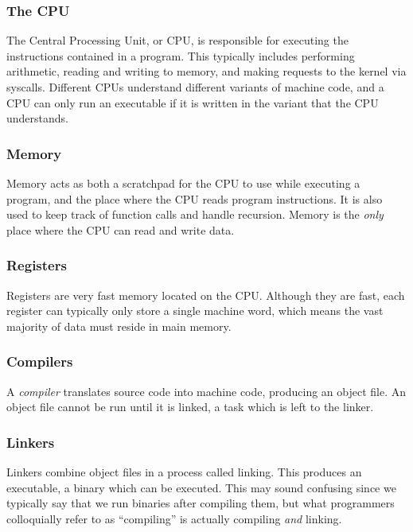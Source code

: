 \subsubsection{The CPU}
The Central Processing Unit, or CPU, is responsible for executing the
instructions contained in a program. This typically includes performing
arithmetic, reading and writing to memory, and making requests to the kernel via
syscalls. Different CPUs understand different variants of machine code, and a
CPU can only run an executable if it is written in the variant that the CPU
understands.

\subsubsection{Memory}
Memory acts as both a scratchpad for the CPU to use while executing a program,
and the place where the CPU reads program instructions. It is also used to keep
track of function calls and handle recursion. Memory is the \emph{only} place
where the CPU can read and write data.

\subsubsection{Registers}
Registers are very fast memory located on the CPU. Although they are fast, each
register can typically only store a single machine word, which means the vast
majority of data must reside in main memory. 

\subsubsection{Compilers}
A \emph{compiler} translates source code into machine code, producing an object
file. An object file cannot be run until it is linked, a task which is left
to the linker. 

\subsubsection{Linkers}
Linkers combine object files in a process called linking. This produces an
executable, a binary which can be executed. This may sound confusing since we
typically say that we run binaries after compiling them, but what programmers
colloquially refer to as ``compiling'' is actually compiling \textit{and}
linking.
